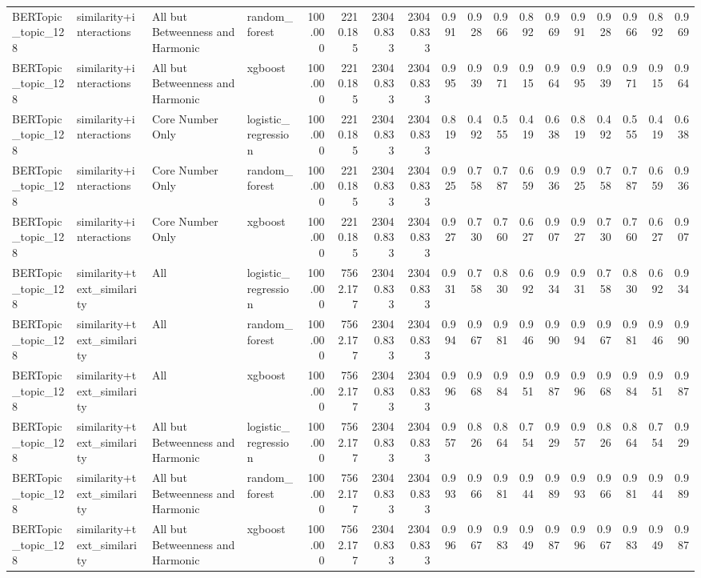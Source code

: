 \begin{tabular}{llllrrrrrrrrrrrrrr}
BERTopic\_topic\_128 & similarity+interactions & All but Betweenness and Harmonic & random\_forest & 100.000 & 2210.185 & 23040.833 & 23040.833 & 0.991 & 0.928 & 0.966 & 0.892 & 0.969 & 0.991 & 0.928 & 0.966 & 0.892 & 0.969 \\
BERTopic\_topic\_128 & similarity+interactions & All but Betweenness and Harmonic & xgboost & 100.000 & 2210.185 & 23040.833 & 23040.833 & 0.995 & 0.939 & 0.971 & 0.915 & 0.964 & 0.995 & 0.939 & 0.971 & 0.915 & 0.964 \\
BERTopic\_topic\_128 & similarity+interactions & Core Number Only & logistic\_regression & 100.000 & 2210.185 & 23040.833 & 23040.833 & 0.819 & 0.492 & 0.555 & 0.419 & 0.638 & 0.819 & 0.492 & 0.555 & 0.419 & 0.638 \\
BERTopic\_topic\_128 & similarity+interactions & Core Number Only & random\_forest & 100.000 & 2210.185 & 23040.833 & 23040.833 & 0.925 & 0.758 & 0.787 & 0.659 & 0.936 & 0.925 & 0.758 & 0.787 & 0.659 & 0.936 \\
BERTopic\_topic\_128 & similarity+interactions & Core Number Only & xgboost & 100.000 & 2210.185 & 23040.833 & 23040.833 & 0.927 & 0.730 & 0.760 & 0.627 & 0.907 & 0.927 & 0.730 & 0.760 & 0.627 & 0.907 \\
BERTopic\_topic\_128 & similarity+text\_similarity & All & logistic\_regression & 100.000 & 7562.177 & 23040.833 & 23040.833 & 0.931 & 0.758 & 0.830 & 0.692 & 0.934 & 0.931 & 0.758 & 0.830 & 0.692 & 0.934 \\
BERTopic\_topic\_128 & similarity+text\_similarity & All & random\_forest & 100.000 & 7562.177 & 23040.833 & 23040.833 & 0.994 & 0.967 & 0.981 & 0.946 & 0.990 & 0.994 & 0.967 & 0.981 & 0.946 & 0.990 \\
BERTopic\_topic\_128 & similarity+text\_similarity & All & xgboost & 100.000 & 7562.177 & 23040.833 & 23040.833 & 0.996 & 0.968 & 0.984 & 0.951 & 0.987 & 0.996 & 0.968 & 0.984 & 0.951 & 0.987 \\
BERTopic\_topic\_128 & similarity+text\_similarity & All but Betweenness and Harmonic & logistic\_regression & 100.000 & 7562.177 & 23040.833 & 23040.833 & 0.957 & 0.826 & 0.864 & 0.754 & 0.929 & 0.957 & 0.826 & 0.864 & 0.754 & 0.929 \\
BERTopic\_topic\_128 & similarity+text\_similarity & All but Betweenness and Harmonic & random\_forest & 100.000 & 7562.177 & 23040.833 & 23040.833 & 0.993 & 0.966 & 0.981 & 0.944 & 0.989 & 0.993 & 0.966 & 0.981 & 0.944 & 0.989 \\
BERTopic\_topic\_128 & similarity+text\_similarity & All but Betweenness and Harmonic & xgboost & 100.000 & 7562.177 & 23040.833 & 23040.833 & 0.996 & 0.967 & 0.983 & 0.949 & 0.987 & 0.996 & 0.967 & 0.983 & 0.949 & 0.987 \\

\end{tabular}
